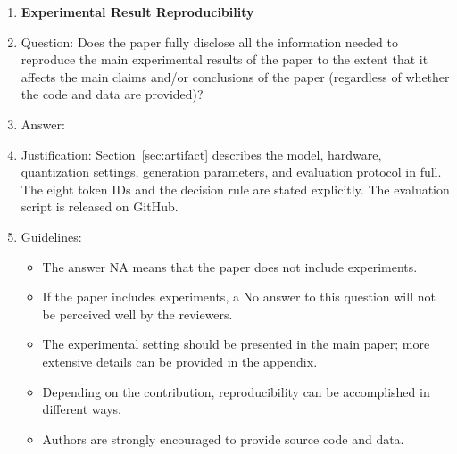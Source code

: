 \begin{enumerate}
\item {\bf Experimental Result Reproducibility}
\item[] Question: Does the paper fully disclose all the information needed to
reproduce the main experimental results of the paper to the extent that it
affects the main claims and/or conclusions of the paper (regardless of whether
the code and data are provided)?
\item[] Answer: \answerYes{}
\item[] Justification: Section~\ref{sec:artifact} describes the model, hardware,
quantization settings, generation parameters, and evaluation protocol in full.
The eight token IDs and the decision rule are stated explicitly. The evaluation
script is released on GitHub.
\item[] Guidelines:
\begin{itemize}
    \item The answer NA means that the paper does not include experiments.
    \item If the paper includes experiments, a No answer to this question will
    not be perceived well by the reviewers.
    \item The experimental setting should be presented in the main paper; more
    extensive details can be provided in the appendix.
    \item Depending on the contribution, reproducibility can be accomplished in
    different ways.
    \item Authors are strongly encouraged to provide source code and data.
\end{itemize}


\end{enumerate}
